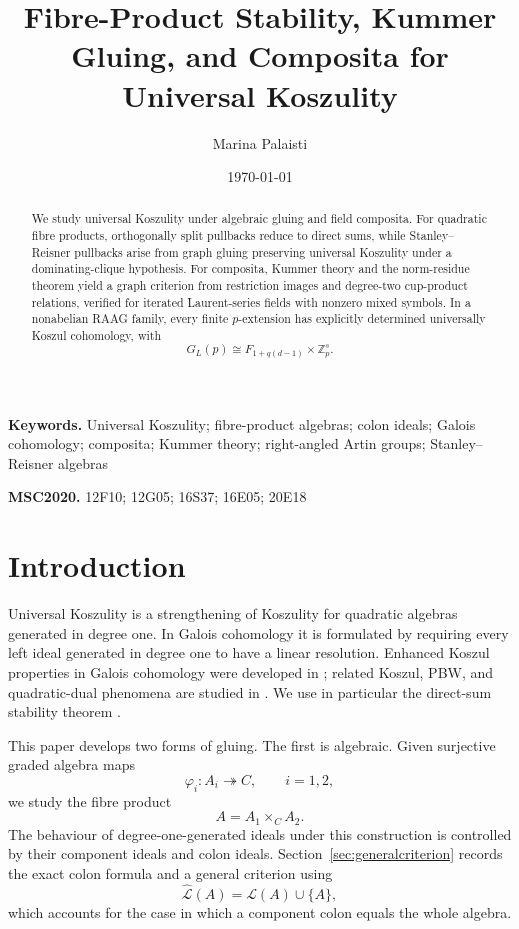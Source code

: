 \documentclass[12pt]{amsart}
\title[Fibre-Product Stability and Composita]{Fibre-Product Stability, Kummer Gluing, and Composita for Universal Koszulity}
\author{Marina Palaisti}
\date{\today}
\theoremstyle{plain}
\theoremstyle{definition}
\theoremstyle{remark}
\numberwithin{equation}{section}
\begin{document}
	\begin{abstract}
		We study universal Koszulity under algebraic gluing and field composita.
		For quadratic fibre products, orthogonally split pullbacks reduce to direct
		sums, while Stanley--Reisner pullbacks arise from graph gluing preserving
		universal Koszulity under a dominating-clique hypothesis. For composita,
		Kummer theory and the norm-residue theorem yield a graph criterion from
		restriction images and degree-two cup-product relations, verified for
		iterated Laurent-series fields with nonzero mixed symbols. In a nonabelian
		RAAG family, every finite \(p\)-extension has explicitly determined
		universally Koszul cohomology, with
		\[
		G_L(p)\cong F_{1+q(d-1)}\times\mathbb Z_p^s.
		\]
	\end{abstract}

\maketitle

\noindent\textbf{Keywords.}
Universal Koszulity; fibre-product algebras; colon ideals;
Galois cohomology; composita; Kummer theory; right-angled Artin groups;
Stanley--Reisner algebras

\medskip
\noindent\textbf{MSC2020.}
12F10; 12G05; 16S37; 16E05; 20E18

\section{Introduction}\label{sec:intro}

Universal Koszulity is a strengthening of Koszulity for quadratic algebras
generated in degree one. In Galois cohomology it is formulated by requiring
every left ideal generated in degree one to have a linear resolution.
Enhanced Koszul properties in Galois cohomology were developed in
\cite{MinacPalaistiPasiniTan,PalaistiThesis}; related Koszul, PBW, and
quadratic-dual phenomena are studied in
\cite{MinacPasiniQuadrelliTan}. We use in particular the direct-sum
stability theorem \cite[Proposition~30]{MinacPalaistiPasiniTan}.

This paper develops two forms of gluing. The first is algebraic. Given
surjective graded algebra maps
\[
\varphi_i:A_i\twoheadrightarrow C,\qquad i=1,2,
\]
we study the fibre product
\[
A=A_1\times_C A_2.
\]
The behaviour of degree-one-generated ideals under this construction is
controlled by their component ideals and colon ideals. Section~\ref{sec:generalcriterion}
records the exact colon formula and a general criterion using
\[
\widehat{\mathcal L}(A)=\mathcal L(A)\cup\{A\},
\]
which accounts for the case in which a component colon equals the whole
algebra.
\end{document}
